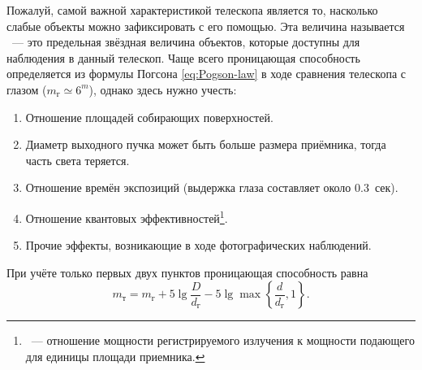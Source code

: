 Пожалуй, самой важной характеристикой телескопа является то, насколько слабые объекты можно зафиксировать с его помощью. Эта величина называется ~--- это предельная звёздная величина объектов, которые доступны для наблюдения в данный телескоп. Чаще всего проницающая способность определяется из формулы Погсона \eqref{eq:Pogson-law} в ходе сравнения телескопа с глазом ($m_\text{г} \simeq 6^m$), однако здесь нужно учесть:
\begin{enumerate}
	\item Отношение площадей собирающих поверхностей.
	\item Диаметр выходного пучка может быть больше размера приёмника, тогда часть света теряется.
	\item Отношение времён экспозиций (выдержка глаза составляет около 0.3~сек).
	\item Отношение квантовых эффективностей\footnote{~--- отношение мощности регистрируемого излучения к мощности подающего для единицы площади приемника.}.
	\item Прочие эффекты, возникающие в ходе фотографических наблюдений.
\end{enumerate}
При учёте только первых двух пунктов проницающая способность равна
\begin{equation}
	m_\text{т} = m_\text{г} + 5\lg\frac{D}{d_\text{г}} - 5\lg\max \left\{ \frac{d}{d_\text{г}}, 1\right\}.
\end{equation}
